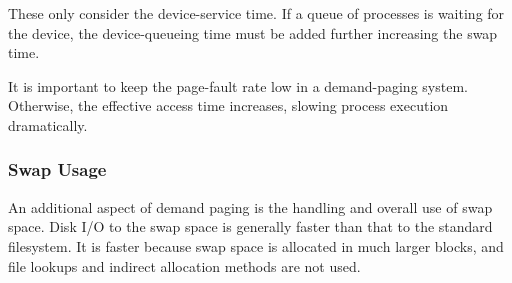 These only consider the device-service time.
If a queue of processes is waiting for the device, the device-queueing time must be added further increasing the swap time.

\begin{blackbox}
  It is important to keep the page-fault rate low in a demand-paging system.
  Otherwise, the effective access time increases, slowing process execution dramatically.
\end{blackbox}

\subsubsection{Swap Usage}\label{subsubsec:Demand_Paging_Swap_Usage}
An additional aspect of demand paging is the handling and overall use of swap space.
Disk I/O to the swap space is generally faster than that to the standard filesystem.
It is faster because swap space is allocated in much larger blocks, and file lookups and indirect allocation methods are not used.


